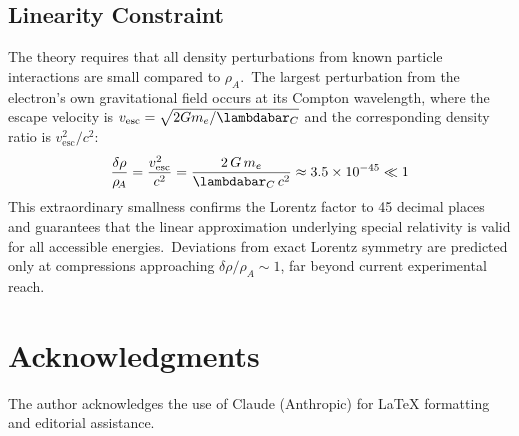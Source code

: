 ﻿\documentclass[12pt,letterpaper]{article}
\newcommand{\rhoa}{\rho_{\!A}}
\begin{document}
\subsection{Linearity Constraint}

The theory requires that all density perturbations from known particle
interactions are small compared to $\rhoa$.\ The largest perturbation from
the electron's own gravitational field occurs at its Compton wavelength,
where the escape velocity is $v_{\mathrm{esc}} = \sqrt{2Gm_e/\lambdabar_C}$
and the corresponding density ratio is $v_{\mathrm{esc}}^2/c^2$:
%
\begin{equation}
  \frac{\delta\rho}{\rhoa} = \frac{v_{\mathrm{esc}}^2}{c^2}
    = \frac{2\,G\,m_e}{\lambdabar_C\,c^2}
    \approx 3.5 \times 10^{-45} \ll 1
  \label{eq:sum-linearity}
\end{equation}
%
This extraordinary smallness confirms the Lorentz factor to 45 decimal places
and guarantees that the linear approximation underlying special relativity is
valid for all accessible energies.\ Deviations from exact Lorentz symmetry
are predicted only at compressions approaching $\delta\rho/\rhoa \sim 1$,
far beyond current experimental reach.



\section*{Acknowledgments}

The author acknowledges the use of Claude (Anthropic) for \LaTeX{} formatting
and editorial assistance.

\bigskip


\end{document}
